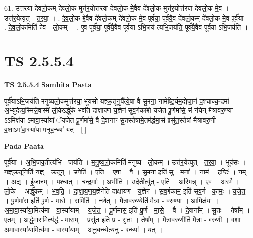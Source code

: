 \documentclass[17pt]{extarticle}
\begin{document}
61. उत्त॑रया देवलो॒कम् दे॑वलो॒क मुत्त॑र॒योत्त॑रया देवलो॒क मे॒वैव दे॑वलो॒क मुत्त॑र॒योत्त॑रया देवलो॒क मे॒व । . उत्त॑र॒येत्युत् - त॒र॒या॒ । . दे॒व॒लो॒क मे॒वैव दे॑वलो॒कम् दे॑वलो॒क मे॒व पूर्व॑या॒ पूर्व॑यै॒व दे॑वलो॒कम् दे॑वलो॒क मे॒व पूर्व॑या । . दे॒व॒लो॒कमिति॑ देव - लो॒कम् । . ए॒व पूर्व॑या॒ पूर्व॑यै॒वैव पूर्व॑या ऽभि॒जय॑ त्यभि॒जय॑ति॒ पूर्व॑यै॒वैव पूर्व॑या ऽभि॒जय॑ति । \newline
\pagebreak
{}
\section*{ TS 2.5.5.4 }

\textbf{TS 2.5.5.4 } \newline
\textbf{Samhita Paata} \newline

पूर्व॑याऽभि॒जय॑ति मनुष्यलो॒कमुत्त॑रया॒ भूय॑सो यज्ञ्क्र॒तूनुपै᳚त्ये॒षा वै सु॒मना॒ नामेष्टि॒र्यम॒द्येजा॒नं प॒श्चाच्च॒न्द्रमा॑ अ॒भ्यु॑देत्य॒स्मिन्ने॒वास्मै॑ लो॒केऽर्द्धु॑कं भवति दाक्षायण य॒ज्ञेन॑ सुव॒र्गका॑मो यजेत पू॒र्णमा॑से॒ सं न॑येन्-मैत्रावरु॒ण्या ऽऽमिक्ष॑या ऽमावा॒स्या॑यां ॅयजेत पू॒र्णमा॑से॒ वै दे॒वानाꣳ॑ सु॒तस्तेषा॑मे॒तम॑र्द्धमा॒सं प्रसु॑त॒स्तेषां᳚ मैत्रावरु॒णी व॒शाऽमा॑वा॒स्या॑या-मनूब॒न्ध्या॑ यत् - [  ] \newline

\textbf{Pada Paata} \newline

पूर्व॑या । अ॒भि॒जय॒तीत्य॑भि - जय॑ति । म॒नु॒ष्य॒लो॒कमिति॑ मनुष्य - लो॒कम् । उत्त॑र॒येत्युत् - त॒र॒या॒ । भूय॑सः । य॒ज्ञ्॒क्र॒तूनिति॑ यज्ञ् - क्र॒तून् । उपेति॑ । ए॒ति॒ । ए॒षा । वै । सु॒मना॒ इति॑ सु - मनाः᳚ । नाम॑ । इष्टिः॑ । यम् । अ॒द्य । ई॒जा॒नम् । प॒श्चात् । च॒न्द्रमाः᳚ । अ॒भीति॑ । उ॒देतीत्यु॑त् - एति॑ । अ॒स्मिन्न् । ए॒व । अ॒स्मै॒ । लो॒के । अर्द्धु॑कम् । भ॒व॒ति॒ । दा॒क्षा॒य॒ण॒य॒ज्ञेनेति॑ दाक्षायण - य॒ज्ञेन॑ । सु॒व॒र्गका॑म॒ इति॑ सुव॒र्ग - का॒मः॒ । य॒जे॒त॒ । पू॒र्णमा॑स॒ इति॑ पू॒र्ण - मा॒से॒ । समिति॑ । न॒ये॒त् । मै॒त्रा॒व॒रु॒ण्येति॑ मैत्रा - व॒रु॒ण्या । आ॒मिक्ष॑या । अ॒मा॒वा॒स्या॑या॒मित्य॑मा - वा॒स्या॑याम् । य॒जे॒त॒ । पू॒र्णमा॑स॒ इति॑ पू॒र्ण - मा॒से॒ । वै । दे॒वाना᳚म् । सु॒तः । तेषा᳚म् । ए॒तम् । अ॒र्द्ध॒मा॒समित्य॑र्द्ध - मा॒सम् । प्रसु॑त॒ इति॒ प्र - सु॒तः॒ । तेषा᳚म् । मै॒त्रा॒वरु॒णीति॑ मैत्रा - व॒रु॒णी । व॒शा । अ॒मा॒वा॒स्या॑या॒मित्य॑मा - वा॒स्या॑याम् । अ॒नू॒ब॒न्ध्येत्य॑नु - ब॒न्ध्या᳚ । यत् ।  \newline
\end{document}
